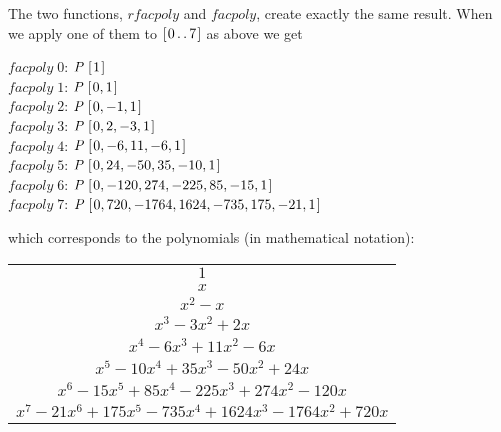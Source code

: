 \documentclass[tikz]{scrreprt}
\newcommand{\Conid}[1]{\mathit{#1}}
\newcommand{\Varid}[1]{\mathit{#1}}
\begin{document}
The two functions, \ensuremath{\Varid{rfacpoly}} and \ensuremath{\Varid{facpoly}},
create exactly the same result.
When we apply one of them to \ensuremath{[\mskip1.5mu \mathrm{0}\mathinner{\ldotp\ldotp}\mathrm{7}\mskip1.5mu]} 
as above we get

\begin{minipage}{\textwidth}
\ensuremath{\Varid{facpoly}\;\mathrm{0}}: \ensuremath{\Conid{P}\;[\mskip1.5mu \mathrm{1}\mskip1.5mu]}\\
\ensuremath{\Varid{facpoly}\;\mathrm{1}}: \ensuremath{\Conid{P}\;[\mskip1.5mu \mathrm{0},\mathrm{1}\mskip1.5mu]}\\
\ensuremath{\Varid{facpoly}\;\mathrm{2}}: \ensuremath{\Conid{P}\;[\mskip1.5mu \mathrm{0},\mathbin{-}\mathrm{1},\mathrm{1}\mskip1.5mu]}\\ 
\ensuremath{\Varid{facpoly}\;\mathrm{3}}: \ensuremath{\Conid{P}\;[\mskip1.5mu \mathrm{0},\mathrm{2},\mathbin{-}\mathrm{3},\mathrm{1}\mskip1.5mu]}\\ 
\ensuremath{\Varid{facpoly}\;\mathrm{4}}: \ensuremath{\Conid{P}\;[\mskip1.5mu \mathrm{0},\mathbin{-}\mathrm{6},\mathrm{11},\mathbin{-}\mathrm{6},\mathrm{1}\mskip1.5mu]}\\ 
\ensuremath{\Varid{facpoly}\;\mathrm{5}}: \ensuremath{\Conid{P}\;[\mskip1.5mu \mathrm{0},\mathrm{24},\mathbin{-}\mathrm{50},\mathrm{35},\mathbin{-}\mathrm{10},\mathrm{1}\mskip1.5mu]}\\ 
\ensuremath{\Varid{facpoly}\;\mathrm{6}}: \ensuremath{\Conid{P}\;[\mskip1.5mu \mathrm{0},\mathbin{-}\mathrm{120},\mathrm{274},\mathbin{-}\mathrm{225},\mathrm{85},\mathbin{-}\mathrm{15},\mathrm{1}\mskip1.5mu]}\\
\ensuremath{\Varid{facpoly}\;\mathrm{7}}: \ensuremath{\Conid{P}\;[\mskip1.5mu \mathrm{0},\mathrm{720},\mathbin{-}\mathrm{1764},\mathrm{1624},\mathbin{-}\mathrm{735},\mathrm{175},\mathbin{-}\mathrm{21},\mathrm{1}\mskip1.5mu]} 
\end{minipage}

which corresponds to the polynomials (in mathematical notation):

\begin{center}
\begin{tabular}{c}
$1$ \\
$x$ \\
$x^2 - x$ \\
$x^3 - 3x^2 + 2x$ \\
$x^4 - 6x^3 + 11x^2 - 6x$ \\
$x^5 - 10x^4 + 35x^3 -50x^2 + 24x$ \\
$x^6 - 15x^5 + 85x^4 - 225x^3 + 274x^2 -120x$ \\
$ x^7 - 21x^6 + 175x^5 - 735x^4 + 1624x^3 - 1764x^2 + 720x$  
\end{tabular}
\end{center}
\end{document}
